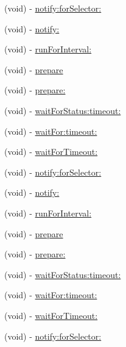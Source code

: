 \begin{DoxyCompactItemize}
\item 
(void) -\/ \hyperlink{interface_g_h_async_test_case_ab1be43eb4f4909ce5607b51fa0a1f40b}{notify\-:for\-Selector\-:}
\item 
(void) -\/ \hyperlink{interface_g_h_async_test_case_ad21d6cdd1f2a284ee7b5ad5b6d1c82e2}{notify\-:}
\item 
(void) -\/ \hyperlink{interface_g_h_async_test_case_accbc972d3d516d1e53529c84fa2fc510}{run\-For\-Interval\-:}
\item 
(void) -\/ \hyperlink{interface_g_h_async_test_case_a8eda5b64c599e0c48bbd206840bd4cde}{prepare}
\item 
(void) -\/ \hyperlink{interface_g_h_async_test_case_a085b47a16f4a790d77ba78bd2eafb3ff}{prepare\-:}
\item 
(void) -\/ \hyperlink{interface_g_h_async_test_case_ae8781529003ebef3a06569c0157687ae}{wait\-For\-Status\-:timeout\-:}
\item 
(void) -\/ \hyperlink{interface_g_h_async_test_case_a43422127c8303a93f0ae39c883a2da06}{wait\-For\-:timeout\-:}
\item 
(void) -\/ \hyperlink{interface_g_h_async_test_case_aaf22dd45b3493e110362392cc3dc086b}{wait\-For\-Timeout\-:}
\item 
(void) -\/ \hyperlink{interface_g_h_async_test_case_ab1be43eb4f4909ce5607b51fa0a1f40b}{notify\-:for\-Selector\-:}
\item 
(void) -\/ \hyperlink{interface_g_h_async_test_case_ad21d6cdd1f2a284ee7b5ad5b6d1c82e2}{notify\-:}
\item 
(void) -\/ \hyperlink{interface_g_h_async_test_case_accbc972d3d516d1e53529c84fa2fc510}{run\-For\-Interval\-:}
\item 
(void) -\/ \hyperlink{interface_g_h_async_test_case_a8eda5b64c599e0c48bbd206840bd4cde}{prepare}
\item 
(void) -\/ \hyperlink{interface_g_h_async_test_case_a085b47a16f4a790d77ba78bd2eafb3ff}{prepare\-:}
\item 
(void) -\/ \hyperlink{interface_g_h_async_test_case_ae8781529003ebef3a06569c0157687ae}{wait\-For\-Status\-:timeout\-:}
\item 
(void) -\/ \hyperlink{interface_g_h_async_test_case_a43422127c8303a93f0ae39c883a2da06}{wait\-For\-:timeout\-:}
\item 
(void) -\/ \hyperlink{interface_g_h_async_test_case_aaf22dd45b3493e110362392cc3dc086b}{wait\-For\-Timeout\-:}
\item 
(void) -\/ \hyperlink{interface_g_h_async_test_case_ab1be43eb4f4909ce5607b51fa0a1f40b}{notify\-:for\-Selector\-:}

\end{DoxyCompactItemize}
